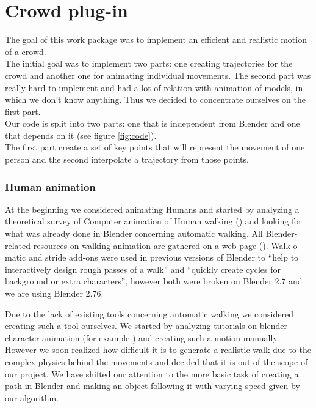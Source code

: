 \section{Crowd plug-in}

The goal of this work package was to implement an efficient and realistic motion of a crowd. \\
The initial goal was to implement two parts: one creating trajectories for the crowd and another one for animating individual movements. The second part was really hard to implement and had a lot of relation with animation of models, in which we don't know anything. Thus we decided to concentrate ourselves on the first part.\\
Our code is split into two parts: one that is independent from Blender and one that depends on it (see figure \ref{fig:code}). \\
The first part create a set of key points that will represent the movement of one person and the second interpolate a trajectory from those points.


\subsubsection{Human animation}

At the beginning we considered animating Humans and started by analyzing a theoretical survey of Computer animation of Human walking (\cite{th_walking}) and looking for what was already done in Blender concerning automatic walking. All Blender-related resources on walking animation are gathered on a web-page (\cite{blwikiwalking}). Walk-o-matic and stride add-ons were used in previous versions of Blender to ``help to interactively design rough passes of a walk'' and ``quickly create cycles for background or extra characters'', however both were broken on Blender 2.7 and we are using Blender 2.76. 

Due to the lack of existing tools concerning automatic walking we considered creating such a tool ourselves. We started by analyzing tutorials on blender character animation (for example \cite{tuto_walk}) and creating such a motion manually. However we soon realized how difficult it is to generate a realistic walk due to the complex physics behind the movements and decided that it is out of the scope of our project. We have shifted our attention to the more basic task of creating a path in Blender and making an object following it with varying speed given by our algorithm.


